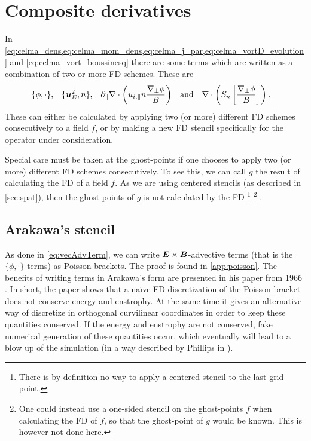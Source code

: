 \section{Composite derivatives}
\label{sec:compDeriv}
%
In \cref{eq:celma_dens,eq:celma_mom_dens,eq:celma_j_par,eq:celma_vortD_evolution} and \cref{eq:celma_vort_boussinesq} there are some terms which are written as a combination of two or more FD schemes.
These are
%
\begin{align*}
    &\{\phi,\cdot\},&
    &\{\boldsymbol{u}_E^2,n\},&
    &\partial_\|\nabla\cdot \left( u_{i,\|}n \frac{\nabla_\perp \phi}{B}\right)&
    &\text{and}&
    &\nabla\cdot \left( S_n \left[ \frac{ \nabla_\perp \phi }{ B } \right] \right).&
\end{align*}
%
These can either be calculated by applying two (or more) different FD schemes consecutively to a field $f$, or by making a new FD stencil specifically for the operator under consideration.

Special care must be taken at the ghost-points if one chooses to apply two (or more) different FD schemes consecutively.
To see this, we can call $g$ the result of calculating the FD of a field $f$.
As we are using centered stencils (as described in \cref{sec:spat}), then the ghost-points of $g$ is not calculated by the FD%
%
\footnote{There is by definition no way to apply a centered stencil to the last grid point.}%
%
\footnote{One could instead use a one-sided stencil on the ghost-points $f$ when calculating the FD of $f$, so that the ghost-point of $g$ would be known.
This is however not done here.}
%
.

\subsection{Arakawa's stencil}
%
As done in \cref{eq:vecAdvTerm}, we can write $\boldsymbol{E}\times\boldsymbol{B}$-advective terms (that is the $\{\phi,\cdot\}$ terms) as Poisson brackets.
The proof is found in \cref{app:poisson}.
The benefits of writing terms in Arakawa's form are presented in his paper from 1966 \cite{Arakwa1966}.
In short, the paper shows that a na\"ive FD discretization of the Poisson bracket does not conserve energy and enstrophy.
At the same time it gives an alternative way of discretize in orthogonal curvilinear coordinates in order to keep these quantities conserved.
If the energy and enstrophy are not conserved, fake numerical generation of these quantities occur, which eventually will lead to a blow up of the simulation (in a way described by Phillips in \cite{Phillips1959}).

